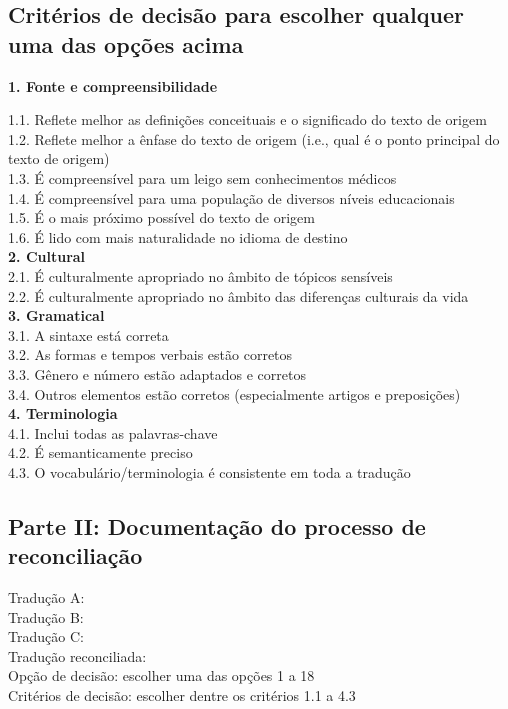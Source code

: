 \begin{appendix}
\begin{flushleft}
\subsection{Critérios de decisão para escolher qualquer uma das opções acima}

\textbf{1.	Fonte e compreensibilidade}

1.1.	 Reflete melhor as definições conceituais e o significado do texto de origem\\
1.2.	 Reflete melhor a ênfase do texto de origem (i.e., qual é o ponto principal do texto de origem)\\
1.3.	 É compreensível para um leigo sem conhecimentos médicos\\
1.4.	 É compreensível para uma população de diversos níveis educacionais\\
1.5.	 É o mais próximo possível do texto de origem\\
1.6.	 É lido com mais naturalidade no idioma de destino\\
\textbf{2.	Cultural}\\
2.1.	 É culturalmente apropriado no âmbito de tópicos sensíveis\\
2.2.	 É culturalmente apropriado no âmbito das diferenças culturais da vida\\
\textbf{3.	Gramatical}\\
3.1.	 A sintaxe está correta\\
3.2.	 As formas e tempos verbais estão corretos\\
3.3.	 Gênero e número estão adaptados e corretos\\
3.4.	 Outros elementos estão corretos (especialmente artigos e preposições)\\
\textbf{4.	Terminologia}\\
4.1.	 Inclui todas as palavras-chave\\
4.2.	 É semanticamente preciso\\
4.3.	 O vocabulário/terminologia é consistente em toda a tradução\\

\subsection{Parte II: Documentação do processo de reconciliação}

Tradução A:\\
Tradução B:\\
Tradução C:\\
Tradução reconciliada:\\
Opção de decisão: escolher uma das opções 1 a 18\\
Critérios de decisão: escolher dentre os critérios 1.1 a 4.3
\end{flushleft}
\end{appendix}